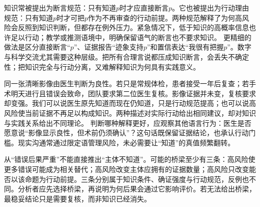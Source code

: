 知识常被提出为断言规范：只有知道$p$时才应直接断言$p$。它也被提出为行动理由规范：只有知道$p$时才可把$p$作为不再审查的行动前提。两种规范解释了为何高风险会反照到知识判断，但都存在例外压力。紧急情况下，低于知识的高概率信息也许足以行动；教学或推测语境中，明确保留语气的断言也不要求知识。 更精细的做法是区分直接断言“$p$”、证据报告“迹象支持$p$”和置信表达“我很有把握$p$”。数字与科学交流尤其需要这种层级。把所有合理言说都压成知识断言，会丢失不确定性；把知识完全与行动分离，又难解释知识为何具有实践意义。

同一张清晰影像由医生判断为良性。若只是常规体检，患者接受一年后复查；若手术明天进行且错误会致命，团队要求第二位医生复核。影像证据并未变，复核要求却变强。我们可以说医生原先知道而现在仍知道，只是行动规范提高；也可以说高风险使当前证据不再足以构成知识。两种描述对实际行动给出相同建议，却对知识与实践关系给出不同理论。 判断哪种解释更好，应观察其他语言行为：医生是否愿意说“影像显示良性，但术前仍须确认”？这句话既保留证据结论，也承认行动门槛。现实沟通常通过限定语管理风险，未必需要让“知道”的真值频繁翻转。

从“错误后果严重”不能直接推出“主体不知道”。可能的桥梁至少有三条：高风险使更多错误可能成为相关替代；高风险改变主体应拥有的证据数量；高风险只改变能否以该命题为行动前提。三条分别属于知识条件、确证强度与行动规范，反例也不同。分析者应先选择桥梁，再说明为何后果会通过它影响评价。若无法给出桥梁，最稳妥结论只是需要复核，而非知识已经消失。
